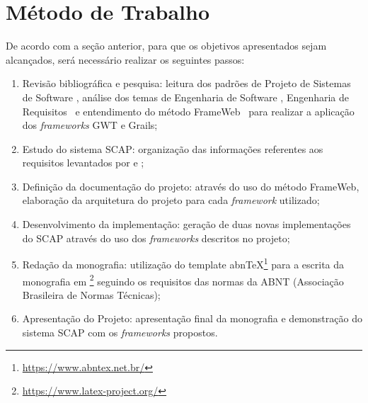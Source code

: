 
\section{Método de Trabalho}
\label{sec-metodo}


	
	

De acordo com a seção anterior, para que os objetivos apresentados sejam alcançados, será necessário realizar os seguintes passos:

\begin{enumerate}

    \item Revisão bibliográfica e pesquisa: leitura dos padrões de Projeto de Sistemas de Software \cite{falbo:pss18}, análise dos temas de Engenharia de Software \cite{falbo:es14}, Engenharia de Requisitos~\cite{falbo:er17} e entendimento do método FrameWeb~\cite{souza:masterthesis07} para realizar a aplicação dos \textit{frameworks} GWT e Grails;
    \item Estudo do sistema SCAP: organização das informações referentes aos requisitos levantados por  e ;
    \item Definição da documentação do projeto: através do uso do método FrameWeb, elaboração da arquitetura do projeto para cada \textit{framework} utilizado;
    \item Desenvolvimento da implementação: geração de duas novas implementações do SCAP através do uso dos \textit{frameworks} descritos no projeto; 
    \item Redação da monografia: utilização do template abnTeX\footnote{\url{https://www.abntex.net.br/}} para a escrita da monografia em \latex\footnote{\url{https://www.latex-project.org/}} seguindo os requisitos das normas da ABNT (Associação Brasileira de Normas Técnicas);
    \item Apresentação do Projeto: apresentação final da monografia e demonstração do sistema SCAP com os \textit{frameworks} propostos.

\end{enumerate}    
    